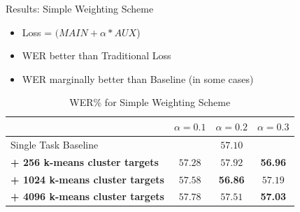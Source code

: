 \documentclass[final]{beamer} %
\begin{document}
\begin{frame}
\begin{columns}
\begin{column}{0.23\textwidth}
{        
        \begin{block}{\boxnumber Results: Simple Weighting Scheme}
          \begin{itemize}
          \item Loss = $(MAIN + \alpha*AUX$)
          \item WER better than Traditional Loss
          \item WER marginally better than Baseline (in some cases)
          \end{itemize}
        \end{block}        

        \vfill
        
        
        \begin{table}[!htbp]
          \centering
          \caption{WER\% for Simple Weighting Scheme}
          \begin{adjustbox}{width=\textwidth}
            \begin{tabular}{lccc}
              \toprule
              & $\alpha = 0.1 $ & $\alpha = 0.2 $ & $\alpha = 0.3 $\\
              \midrule
              Single Task Baseline  &  \multicolumn{3}{c}{$57.10 $ \raisebox{.33\height}{\footnotesize{$\pm 3.25$}}}     \\
              \textbf{+ 256 k-means cluster targets}  &  $57.28 $ \raisebox{.33\height}{\footnotesize{$\pm 2.09$}}   &  $57.92 $ \raisebox{.33\height}{\footnotesize{$\pm 1.78$}}     & \textbf{56.96} \raisebox{.33\height}{\footnotesize{$\pm  .70$}} \\
              \textbf{+ 1024 k-means cluster targets}   & $ 57.58$ \raisebox{.33\height}{\footnotesize{$\pm 2.68$}}    & \textbf{ 56.86} \raisebox{.33\height}{\footnotesize{$\pm 1.11$}}    & $57.19  $ \raisebox{.33\height}{\footnotesize{$\pm 1.31$}}  \\
              \textbf{+ 4096 k-means cluster targets}   &  $57.78 $ \raisebox{.33\height}{\footnotesize{$\pm 2.36$}}  & $ 57.51$ \raisebox{.33\height}{\footnotesize{$\pm  2.65$}}   &  \textbf{57.03} \raisebox{.33\height}{\footnotesize{$\pm 1.48$}}  \\
              \bottomrule
            \end{tabular}
          \end{adjustbox}
        \end{table}
        
        \vfill


}
\end{column}
\end{columns}
\end{frame}
\end{document}
